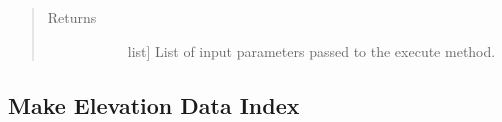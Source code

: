 \documentclass[letterpaper,10pt,english]{sphinxmanual}
\begin{document}
\begin{fulllineitems}
\begin{fulllineitems}
\begin{quote}
\begin{description}
\begin{description}
\end{description}

\item[{Returns}] \leavevmode\begin{description}
\item[{}] \leavevmode{[}list{]}
List of input parameters passed to the execute method.

\end{description}

\end{description}\end{quote}

\end{fulllineitems}


\end{fulllineitems}



\subsection{Make Elevation Data Index}
\label{\detokenize{StreamStats_DataPrep:make-elevation-data-index}}
\end{document}
